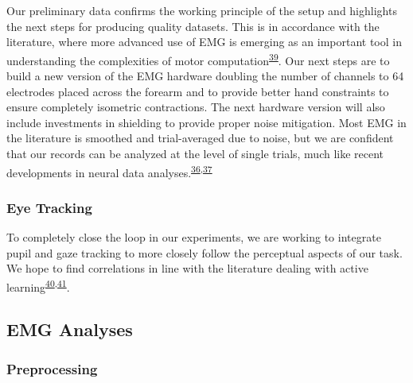 \documentclass[
  a4paper,
]{article}
\begin{document}
Our preliminary data confirms the working principle of the setup and
highlights the next steps for producing quality datasets. This is in
accordance with the literature, where more advanced use of EMG is
emerging as an important tool in understanding the complexities of motor
computation\textsuperscript{\protect\hyperlink{ref-Hug2011}{39}}. Our
next steps are to build a new version of the EMG hardware doubling the
number of channels to 64 electrodes placed across the forearm and to
provide better hand constraints to ensure completely isometric
contractions. The next hardware version will also include investments in
shielding to provide proper noise mitigation. Most EMG in the literature
is smoothed and trial-averaged due to noise, but we are confident that
our records can be analyzed at the level of single trials, much like
recent developments in neural data
analyses.\textsuperscript{\protect\hyperlink{ref-churchlandNeuralPopulationDynamics2012a}{36},\protect\hyperlink{ref-churchlandNeuralVariabilityPremotor2006}{37}}

\hypertarget{eye-tracking}{%
\subsubsection{Eye Tracking}\label{eye-tracking}}

To completely close the loop in our experiments, we are working to
integrate pupil and gaze tracking to more closely follow the perceptual
aspects of our task. We hope to find correlations in line with the
literature dealing with active
learning\textsuperscript{\protect\hyperlink{ref-yangTheoreticalPerspectivesActive2016}{40},\protect\hyperlink{ref-huangActiveLearningLearning2008}{41}}.

\hypertarget{emg-analyses}{%
\subsection{EMG Analyses}\label{emg-analyses}}

\hypertarget{preprocessing}{%
\subsubsection{Preprocessing}\label{preprocessing}}
\end{document}
